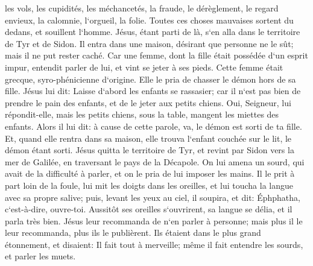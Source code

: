 \verse les vols, les cupidités, les méchancetés, la fraude, le dérèglement, le regard envieux, la calomnie, l`orgueil, la folie. 
\verse Toutes ces choses mauvaises sortent du dedans, et souillent l`homme. 
\verse Jésus, étant parti de là, s`en alla dans le territoire de Tyr et de Sidon. Il entra dans une maison, désirant que personne ne le sût; mais il ne put rester caché. 
\verse Car une femme, dont la fille était possédée d`un esprit impur, entendit parler de lui, et vint se jeter à ses pieds. 
\verse Cette femme était grecque, syro-phénicienne d`origine. Elle le pria de chasser le démon hors de sa fille. Jésus lui dit: 
\verse Laisse d`abord les enfants se rassasier; car il n`est pas bien de prendre le pain des enfants, et de le jeter aux petits chiens. 
\verse Oui, Seigneur, lui répondit-elle, mais les petits chiens, sous la table, mangent les miettes des enfants. 
\verse Alors il lui dit: à cause de cette parole, va, le démon est sorti de ta fille. 
\verse Et, quand elle rentra dans sa maison, elle trouva l`enfant couchée sur le lit, le démon étant sorti. 
\verse Jésus quitta le territoire de Tyr, et revint par Sidon vers la mer de Galilée, en traversant le pays de la Décapole. 
\verse On lui amena un sourd, qui avait de la difficulté à parler, et on le pria de lui imposer les mains. 
\verse Il le prit à part loin de la foule, lui mit les doigts dans les oreilles, et lui toucha la langue avec sa propre salive; 
\verse puis, levant les yeux au ciel, il soupira, et dit: Éphphatha, c`est-à-dire, ouvre-toi. 
\verse Aussitôt ses oreilles s`ouvrirent, sa langue se délia, et il parla très bien. 
\verse Jésus leur recommanda de n`en parler à personne; mais plus il le leur recommanda, plus ils le publièrent. 
\verse Ils étaient dans le plus grand étonnement, et disaient: Il fait tout à merveille; même il fait entendre les sourds, et parler les muets. 

\chapter{}


